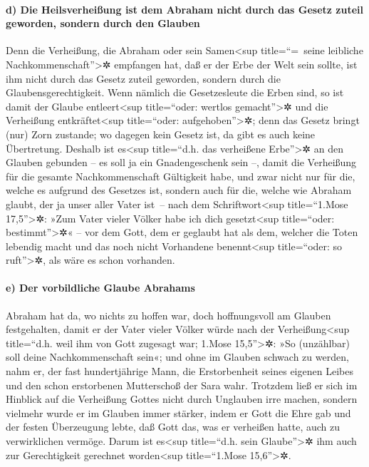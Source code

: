 \hypertarget{d-die-heilsverheiuxdfung-ist-dem-abraham-nicht-durch-das-gesetz-zuteil-geworden-sondern-durch-den-glauben}{%
\paragraph{d) Die Heilsverheißung ist dem Abraham nicht durch das Gesetz
zuteil geworden, sondern durch den
Glauben}\label{d-die-heilsverheiuxdfung-ist-dem-abraham-nicht-durch-das-gesetz-zuteil-geworden-sondern-durch-den-glauben}}

 Denn die Verheißung, die Abraham oder sein
Samen\textless sup title=``=~seine leibliche
Nachkommenschaft''\textgreater✲ empfangen hat, daß er der Erbe der Welt
sein sollte, ist ihm nicht durch das Gesetz zuteil geworden, sondern
durch die Glaubensgerechtigkeit.  Wenn nämlich die
Gesetzesleute die Erben sind, so ist damit der Glaube
entleert\textless sup title=``oder: wertlos gemacht''\textgreater✲ und
die Verheißung entkräftet\textless sup title=``oder:
aufgehoben''\textgreater✲;  denn das Gesetz bringt (nur)
Zorn zustande; wo dagegen kein Gesetz ist, da gibt es auch keine
Übertretung.  Deshalb ist es\textless sup title=``d.h.
das verheißene Erbe''\textgreater✲ an den Glauben gebunden -- es soll ja
ein Gnadengeschenk sein --, damit die Verheißung für die gesamte
Nachkommenschaft Gültigkeit habe, und zwar nicht nur für die, welche es
aufgrund des Gesetzes ist, sondern auch für die, welche wie Abraham
glaubt, der ja unser aller Vater ist~--  nach dem
Schriftwort\textless sup title=``1.Mose 17,5''\textgreater✲: »Zum Vater
vieler Völker habe ich dich gesetzt\textless sup title=``oder:
bestimmt''\textgreater✲« -- vor dem Gott, dem er geglaubt hat als dem,
welcher die Toten lebendig macht und das noch nicht Vorhandene
benennt\textless sup title=``oder: so ruft''\textgreater✲, als wäre es
schon vorhanden.

\hypertarget{e-der-vorbildliche-glaube-abrahams}{%
\paragraph{e) Der vorbildliche Glaube
Abrahams}\label{e-der-vorbildliche-glaube-abrahams}}

 Abraham hat da, wo nichts zu hoffen war, doch
hoffnungsvoll am Glauben festgehalten, damit er der Vater vieler Völker
würde nach der Verheißung\textless sup title=``d.h. weil ihm von Gott
zugesagt war; 1.Mose 15,5''\textgreater✲: »So (unzählbar) soll deine
Nachkommenschaft sein«;  und ohne im Glauben schwach zu
werden, nahm er, der fast hundertjährige Mann, die Erstorbenheit seines
eigenen Leibes und den schon erstorbenen Mutterschoß der Sara wahr.
 Trotzdem ließ er sich im Hinblick auf die Verheißung
Gottes nicht durch Unglauben irre machen, sondern vielmehr wurde er im
Glauben immer stärker, indem er Gott die Ehre gab  und
der festen Überzeugung lebte, daß Gott das, was er verheißen hatte, auch
zu verwirklichen vermöge.  Darum ist es\textless sup
title=``d.h. sein Glaube''\textgreater✲ ihm auch zur Gerechtigkeit
gerechnet worden\textless sup title=``1.Mose 15,6''\textgreater✲.

